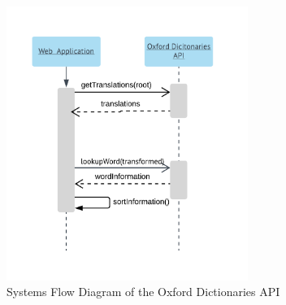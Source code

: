 \begin{figure}[H]
	\caption{Systems Flow Diagram of the Oxford Dictionaries API}
	\label{fig:odsf}
	\begin{center}
	\includegraphics[width=0.7\textwidth]{Graphics/SystemsFlowOxford}
\end{center}
\end{figure}